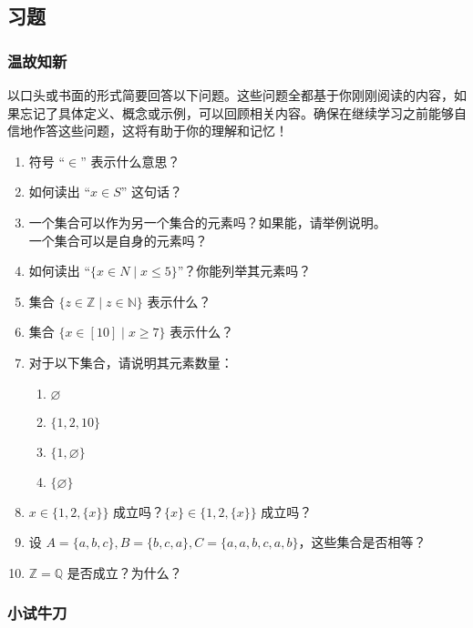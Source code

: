 \subsection{习题}

\subsubsection*{温故知新}

以口头或书面的形式简要回答以下问题。这些问题全都基于你刚刚阅读的内容，如果忘记了具体定义、概念或示例，可以回顾相关内容。确保在继续学习之前能够自信地作答这些问题，这将有助于你的理解和记忆！

\begin{enumerate}[label=(\arabic*)]
    \item 符号 ``$\in$'' 表示什么意思？
    \item 如何读出 ``$x \in S$'' 这句话？
    \item  一个集合可以作为另一个集合的元素吗？如果能，请举例说明。\\一个集合可以是自身的元素吗？
    \item 如何读出 ``$\{x \in N \mid x \le 5\}$''？你能列举其元素吗？
    \item 集合 $\{z \in \mathbb{Z} \mid z \in \mathbb{N}\}$ 表示什么？
    \item 集合 $\{x \in [10] \mid x \ge 7\}$ 表示什么？
    \item 对于以下集合，请说明其元素数量：
        \begin{enumerate}[label=(\alph*)]
            \item $\varnothing$
            \item $\{1, 2, 10\}$
            \item $\{1, \varnothing\}$
            \item $\{\varnothing\}$
        \end{enumerate}
    \item $x \in \{ 1, 2, \{x\} \}$ 成立吗？$\{x\} \in \{ 1, 2, \{x\} \}$ 成立吗？
    \item 设 $A = \{a, b, c\}, B = \{b, c, a\}, C = \{a, a, b, c, a, b\}$，这些集合是否相等？
    \item $\mathbb{Z} = \mathbb{Q}$ 是否成立？为什么？
\end{enumerate}

\subsubsection*{小试牛刀}

